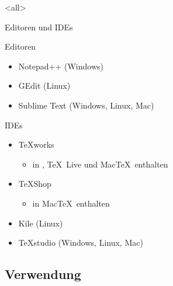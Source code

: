 \mode
<all>

\begin{Frame}{Editoren und IDEs}
  \begin{Block}{Editoren}
    \begin{itemize}
      \item Notepad++ (Windows)
      \item GEdit (Linux)
      \item Sublime Text (Windows, Linux, Mac)
    \end{itemize}
  \end{Block}

  \pause

  \begin{Block}{IDEs}
    \begin{itemize}
      \item \TeX works
        \begin{itemize}
          \item in \MiKTeX, \TeX\ Live und Mac\TeX\ enthalten
        \end{itemize}
      \item \TeX Shop
        \begin{itemize}
          \item in Mac\TeX\ enthalten
        \end{itemize}
      \item Kile (Linux)
      \item TeXstudio (Windows, Linux, Mac)
    \end{itemize}
  \end{Block}
\end{Frame}

\subsection{Verwendung}

